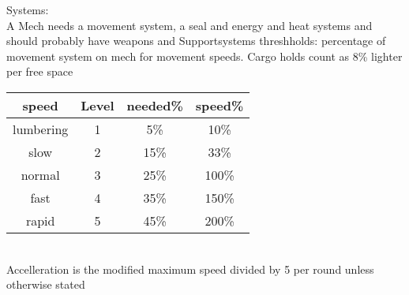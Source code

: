 \documentclass{article}
\begin{document}
    Systems:\\
    A Mech needs a movement system, a seal and energy and heat systems and should probably have weapons and Supportsystems\newline
    threshholds: percentage of movement system on mech for movement speeds. Cargo holds count as 8\% lighter per
    free space\newline
    \begin{tabular}{c|c|c|c}
        speed       &Level  &needed\%& speed\% \\\hline
        lumbering   &1      &5\%     &10\%\\
        slow        &2      &15\%    &33\%\\
        normal      &3      &25\%    &100\%\\
        fast        &4      &35\%    &150\%\\
        rapid       &5      &45\%    &200\%\\
    \end{tabular}\\
    Accelleration is the modified maximum speed divided by 5 per round unless otherwise stated
\end{document}
